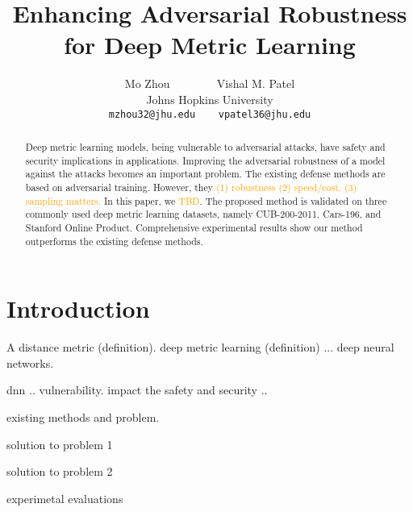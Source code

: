 \documentclass[10pt,twocolumn,letterpaper]{article}
\newcommand{\oo}[1]{\textcolor{orange}{#1}}
\begin{document}
\title{Enhancing Adversarial Robustness for Deep Metric Learning}

\author{Mo Zhou ~~~~~~~ Vishal M. Patel\\
Johns Hopkins University\\
{\tt\small mzhou32@jhu.edu ~~ vpatel36@jhu.edu}
}
\maketitle

\begin{abstract}
	Deep metric learning models, being vulnerable to adversarial
	attacks, have safety and security implications in applications.
	Improving the adversarial robustness of a model against the attacks becomes
	an important problem.
	The existing defense methods are based on adversarial training.
	However, they \oo{(1) robustness (2) speed/cost. (3) sampling matters.}
	In this paper, we \oo{TBD}.
	The proposed method is validated on three commonly
	used deep metric learning datasets, namely CUB-200-2011, Cars-196,
	and Stanford Online Product.
	Comprehensive experimental results show our method outperforms
	the existing defense methods.
\end{abstract}

\section{Introduction}
\label{sec:1}


A distance metric (definition).
deep metric learning (definition) ... deep neural networks.


dnn .. vulnerability.
impact the safety and security ..

existing methods and problem.

solution to problem 1

solution to problem 2

experimetal evaluations
\end{document}
